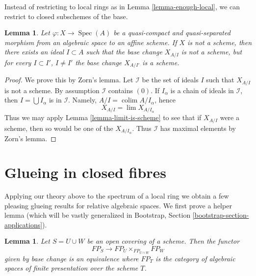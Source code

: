 \documentclass{stacks-project}
\theoremstyle{plain}
\newtheorem{lemma}[subsection]{Lemma}
\theoremstyle{definition}
\theoremstyle{remark}
\numberwithin{equation}{subsection}
\def\lim{\mathop{\mathrm{lim}}\nolimits}
\def\colim{\mathop{\mathrm{colim}}\nolimits}
\def\Spec{\mathop{\mathrm{Spec}}}
\begin{document}
\noindent
Instead of restricting to local rings as in Lemma \ref{lemma-enough-local},
we can restrict to closed subschemes of the base.

\begin{lemma}
\label{lemma-maximal-ideal}
Let $\varphi : X \to \Spec(A)$ be a quasi-compact and quasi-separated
morphism from an algebraic space to an affine scheme.
If $X$ is not a scheme, then there exists an ideal $I \subset A$
such that the base change $X_{A/I}$ is not a scheme, but
for every $I \subset I'$, $I \not = I'$ the base change
$X_{A/I'}$ is a scheme.
\end{lemma}

\begin{proof}
We prove this by Zorn's lemma. Let $\mathcal{I}$ be the set
of ideals $I$ such that $X_{A/I}$ is not a scheme. By
assumption $\mathcal{I}$ contains $(0)$. If $I_\alpha$ is
a chain of ideals in $\mathcal{I}$, then
$I = \bigcup I_\alpha$ is in $\mathcal{I}$. Namely,
$A/I = \colim A/I_\alpha$, hence
$$
X_{A/I} = \lim X_{A/I_\alpha}
$$
Thus we may apply Lemma \ref{lemma-limit-is-scheme} to see that if $X_{A/I}$
were a scheme, then so would be one of the $X_{A/I_\alpha}$.
Thus $\mathcal{I}$ has maximal elements by Zorn's lemma.
\end{proof}






\section{Glueing in closed fibres}
\label{section-change-over-closed-points}

\noindent
Applying our theory above to the spectrum of a local ring we obtain
a few pleasing glueing results for relative algebraic spaces.
We first prove a helper lemma (which will be vastly generalized
in Bootstrap, Section \ref{bootstrap-section-applications}).

\begin{lemma}
\label{lemma-relative-glueing}
Let $S = U \cup W$ be an open covering of a scheme. Then the functor
$$
FP_S \longrightarrow FP_U \times_{FP_{U \cap W}} FP_W
$$
given by base change is an equivalence where $FP_T$
is the category of algebraic spaces of finite presentation over
the scheme $T$.
\end{lemma}
\end{document}
